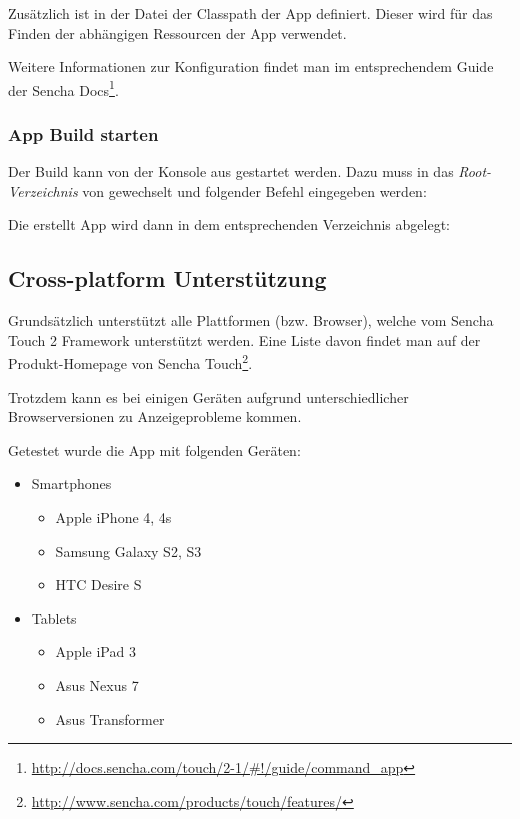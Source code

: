 Zusätzlich ist in der Datei  der Classpath der App definiert.
Dieser wird für das Finden der abhängigen Ressourcen der App verwendet.

Weitere Informationen zur Konfiguration findet man im entsprechendem Guide der Sencha Docs\footnote{\url{http://docs.sencha.com/touch/2-1/\#!/guide/command\_app}}.

\subsubsection{App Build starten}
Der Build kann von der Konsole aus gestartet werden. Dazu muss in das \emph{Root-Verzeichnis} von \kort{} gewechselt und folgender Befehl eingegeben werden:


Die erstellt App wird dann in dem entsprechenden Verzeichnis abgelegt:


\subsection{Cross-platform Unterstützung}
\label{cross-platform}
Grundsätzlich unterstützt \kort{} alle Plattformen (bzw. Browser), welche vom Sencha Touch 2 Framework unterstützt werden.
Eine Liste davon findet man auf der Produkt-Homepage von Sencha Touch\footnote{\url{http://www.sencha.com/products/touch/features/}}.

Trotzdem kann es bei einigen Geräten aufgrund unterschiedlicher Browserversionen zu Anzeigeprobleme kommen.

Getestet wurde die App mit folgenden Geräten:

\begin{itemize}
	\item Smartphones
	\begin{itemize}
		\item Apple iPhone 4, 4s
		\item Samsung Galaxy S2, S3
		\item HTC Desire S
	\end{itemize}
	\item Tablets
	\begin{itemize}
		\item Apple iPad 3
		\item Asus Nexus 7
		\item Asus Transformer
	\end{itemize}
\end{itemize}

